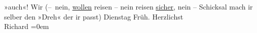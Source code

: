 \begin{ledgroupsized}[t]{13cm}
               »auch«! Wir \label{K_L01849-2v}\label{K_L01849-2h} (– nein, \uline{wollen} reisen – nein reisen \uline{sicher}, nein – Schicksal mach ir selber den »Dreh« der ir passt)
                  Dienstag{ }Früh.\pend
           \pstart
           Herzlichst{\\[\baselineskip]}\spacefill\mbox{Richard}\pend
           \leftskip=0em{}
         
         \endnumbering{}\end{ledgroupsized}  \newcommand{\dateiname}{L01849}\newcommand{\titel}{Richard Beer-Hofmann an Arthur Schnitzler, 26. 6. 1909}\newcommand{\editorInnen}{Martin Anton Müller und Gerd-Hermann Susen}
      